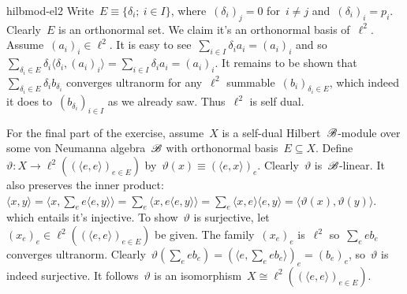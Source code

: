 \begin{solution}{hilbmod-el2}
Write~$E \equiv \{ \delta_i; \ i \in I\}$,
    where~$(\delta_i)_j = 0$ for~$i \neq j$
    and~$(\delta_i)_i = p_i$.
Clearly~$E$ is an orthonormal set.
We claim it's an orthonormal basis of~$\ell^2$.
Assume~$(a_i)_i \in \ell^2$.
It is easy to see~$\sum_{i \in I} \delta_i a_i = (a_i)_i$
    and so~$\sum_{\delta_i \in E} \delta_i \langle \delta_i, (a_i)_i\rangle
        = \sum_{i \in I} \delta_i a_i = (a_i)_i$.
    It remains to be shown that~$\sum_{\delta_i \in E} \delta_i b_{\delta_i}$
        converges ultranorm for any~$\ell^2$ summable~$(b_i)_{\delta_i \in E}$,
        which indeed it does to~$(b_{\delta_i})_{i \in I}$
         as we already saw.
Thus~$\ell^2$ is self dual.

For the final part of the exercise, assume~$X$ is a self-dual Hilbert~$\mathscr{B}$-module
    over some von Neumanna algebra~$\mathscr{B}$ with orthonormal basis~$E \subseteq X$.
Define~$\vartheta\colon X \to \ell^2((\langle e,e\rangle)_{e \in E})$
    by~$\vartheta(x) \equiv (\langle e, x\rangle)_e$.
Clearly~$\vartheta$ is~$\mathscr{B}$-linear.
It also preserves the inner product:
$\langle x, y\rangle = \langle x, \sum_e e \langle e, y\rangle \rangle
    = \sum_e \langle x, e\langle e, y\rangle\rangle
    = \sum_e \langle x, e\rangle\langle e, y\rangle
    = \langle \vartheta(x), \vartheta(y)\rangle$.
    which entails it's injective.
To show~$\vartheta$ is surjective,
    let~$(x_e)_e \in \ell^2((\langle e,e\rangle)_{e \in E})$
    be given.
    The family~$(x_e)_e$ is~$\ell^2$
        so~$\sum_e e b_e$ converges ultranorm.
        Clearly~$\vartheta (\sum_e e b_e)
                = (\langle e, \sum_e e b_e\rangle )_e
                = (b_e)_e$,
    so~$\vartheta$ is indeed surjective.
    It follows~$\vartheta$ is an isomorphism~$X \cong
    \ell^2((\langle e,e\rangle)_{e \in E})$.
\end{solution}
